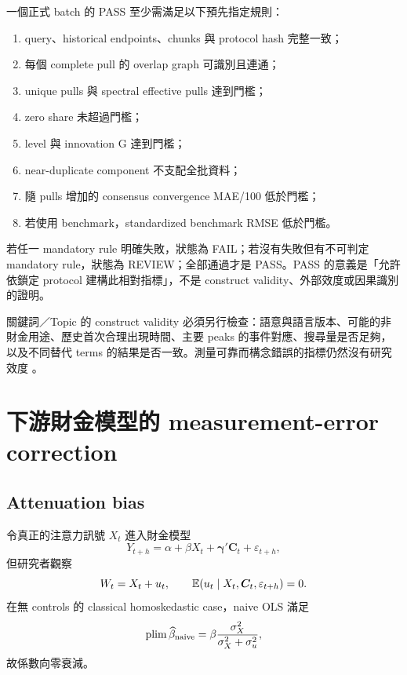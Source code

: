 \documentclass[12pt,a4paper,oneside]{article}
\begin{document}
一個正式 batch 的 PASS 至少需滿足以下預先指定規則：
\begin{enumerate}
  \item query、historical endpoints、chunks 與 protocol hash 完整一致；
  \item 每個 complete pull 的 overlap graph 可識別且連通；
  \item unique pulls 與 spectral effective pulls 達到門檻；
  \item zero share 未超過門檻；
  \item level 與 innovation G 達到門檻；
  \item near-duplicate component 不支配全批資料；
  \item 隨 pulls 增加的 consensus convergence MAE/100 低於門檻；
  \item 若使用 benchmark，standardized benchmark RMSE 低於門檻。
\end{enumerate}

若任一 mandatory rule 明確失敗，狀態為 FAIL；若沒有失敗但有不可判定 mandatory rule，狀態為 REVIEW；全部通過才是 PASS。PASS 的意義是「允許依鎖定 protocol 建構此相對指標」，不是 construct validity、外部效度或因果識別的證明。

關鍵詞／Topic 的 construct validity 必須另行檢查：語意與語言版本、可能的非財金用途、歷史首次合理出現時間、主要 peaks 的事件對應、搜尋量是否足夠，以及不同替代 terms 的結果是否一致。測量可靠而構念錯誤的指標仍然沒有研究效度 \cite{holzl2025}。

\section{下游財金模型的 measurement-error correction}\label{sec:eiv-zh}

\subsection{Attenuation bias}

令真正的注意力訊號 $X_t$ 進入財金模型
\begin{equation}
Y_{t+h}=\alpha+\beta X_t+\bm\gamma'\bm C_t+\varepsilon_{t+h},
\label{eq:downstreamtrue}
\end{equation}
但研究者觀察
\begin{equation}
W_t=X_t+u_t,
\qquad \mathbb{E}(u_t\mid X_t,\bm C_t,\varepsilon_{t+h})=0.
\end{equation}
在無 controls 的 classical homoskedastic case，naive OLS 滿足
\begin{equation}
\operatorname*{plim}\widehat\beta_{\mathrm{naive}}
=\beta\frac{\sigma_X^2}{\sigma_X^2+\sigma_u^2},
\label{eq:attenuation}
\end{equation}
故係數向零衰減。
\end{document}
